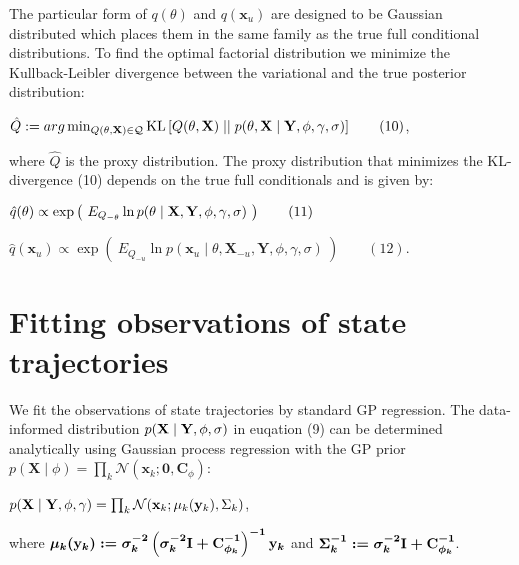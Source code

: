 \begin{par}
The particular form of $q(\theta)$ and $q(\mathbf{x}_u)$ are designed to be Gaussian distributed which places them in the same family as the true full conditional distributions. To find the optimal factorial distribution we minimize the Kullback-Leibler divergence between the variational and the true posterior distribution:
\end{par} \vspace{1em}
\begin{par}
$\hat{Q} := arg \min_{Q(\theta,\mathbf{X}) \in \mathcal{Q}} \mathrm{KL} \left[ Q(\theta,\mathbf{X}) \mid \mid p(\theta,\mathbf{X} \mid \mathbf{Y},\phi, \gamma,\boldmath\sigma) \right] \qquad (10)$,
\end{par} \vspace{1em}
\begin{par}
where $\hat{Q}$ is the proxy distribution. The proxy distribution that minimizes the KL-divergence (10) depends on the true full conditionals and is given by:
\end{par} \vspace{1em}
\begin{par}
$\hat{q}({\theta}) \propto \exp \left(~ E_{Q_{-\theta}} \ln p(\theta \mid \mathbf{X},\mathbf{Y},\phi,\gamma,\boldmath\sigma) ~\right) \qquad (11)$
\end{par} \vspace{1em}
\begin{par}
$\hat{q}(\mathbf{x}_u) \propto \exp\left( ~ E_{Q_{-u}} \ln p(\mathbf{x}_u \mid \theta, \mathbf{X}_{-u},\mathbf{Y},\phi,\gamma,\sigma) ~ \right) \qquad (12)$.
\end{par} \vspace{1em}


\section{Fitting observations of state trajectories}

\begin{par}
We fit the observations of state trajectories by standard GP regression. The data-informed distribution $p(\mathbf{X} \mid \mathbf{Y}, \phi,\boldmath\sigma)$ in euqation (9) can be determined analytically using Gaussian process regression with the GP prior $p(\mathbf{X} \mid \phi) = \prod_k \mathcal{N}(\mathbf{x}_k ; \mathbf{0},\mathbf{C}_{\phi})$:
\end{par} \vspace{1em}
\begin{par}
$p(\mathbf{X} \mid \mathbf{Y}, \phi,\gamma) = \prod_k \mathcal{N}(\mathbf{x}_k ; \boldmath\mu_k(\mathbf{y}_k),\boldmath\Sigma_k)$,
\end{par} \vspace{1em}
\begin{par}
where $\boldmath\mu_k(\mathbf{y}_k) := \sigma_k^{-2} \left(\sigma_k^{-2} \mathbf{I} + \mathbf{C}_{\boldmath\phi_k}^{-1} \right)^{-1} \mathbf{y}_k$ and $\boldmath\Sigma_k ^{-1}:=\sigma_k^{-2} \mathbf{I} + \mathbf{C}_{\boldmath\phi_k}^{-1}$.
\end{par} \vspace{1em}


